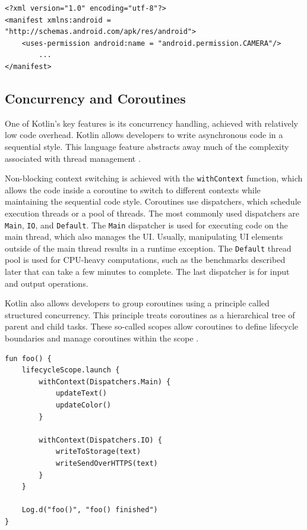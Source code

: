 \label{androidManifestExample}
\begin{lstlisting}
<?xml version="1.0" encoding="utf-8"?>
<manifest xmlns:android = "http://schemas.android.com/apk/res/android">
    <uses-permission android:name = "android.permission.CAMERA"/>
        ...
</manifest>
\end{lstlisting}




\subsection{Concurrency and Coroutines}
\label{concurrencyExplained}
One of Kotlin's key features is its concurrency handling, achieved with relatively low code overhead. Kotlin allows developers to write asynchronous code in a sequential style. This language feature abstracts away much of the complexity associated with thread management \cite{kotlinConcurrency}.

Non-blocking context switching is achieved with the \texttt{withContext} function, which allows the code inside a coroutine to switch to different contexts while maintaining the sequential code style. Coroutines use dispatchers, which schedule execution threads or a pool of threads. The most commonly used dispatchers are \texttt{Main}, \texttt{IO}, and \texttt{Default}. The \texttt{Main} dispatcher is used for executing code on the main thread, which also manages the UI. Usually, manipulating UI elements outside of the main thread results in a runtime exception. The \texttt{Default} thread pool is used for CPU-heavy computations, such as the benchmarks described later that can take a few minutes to complete. The last dispatcher is for input and output operations.

Kotlin also allows developers to group coroutines using a principle called structured concurrency. This principle treats coroutines as a hierarchical tree of parent and child tasks. These so-called scopes allow coroutines to define lifecycle boundaries and manage coroutines within the scope \cite{kotlinConcurrency}.

\begin{minipage}{\textwidth}
\begin{verbatim}
fun foo() {
    lifecycleScope.launch {
        withContext(Dispatchers.Main) {
            updateText()
            updateColor()
        }

        withContext(Dispatchers.IO) {
            writeToStorage(text)
            writeSendOverHTTPS(text)
        }
    }

    Log.d("foo()", "foo() finished")
}
\end{verbatim}
\end{minipage}
\bigskip


